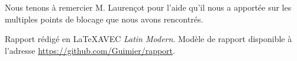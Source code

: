 Nous tenons à remercier M. Laurençot pour l’aide qu’il nous a apportée sur les multiples points de blocage que nous avons rencontrés.

\vfill

\begin{center}
Rapport rédigé en \LaTeX AVEC \emph{Latin Modern}. \newline
Modèle de rapport disponible à l’adresse \url{https://github.com/Guimier/rapport}.
\end{center}
